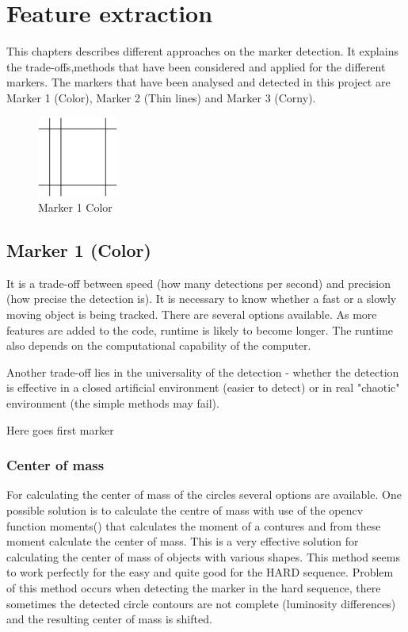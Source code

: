 \chapter{Feature extraction} %
\label{chap:feature_extraction}
This chapters describes different approaches on the marker detection. It explains the trade-offs,methods that have been considered and applied for the different markers. The markers that have been analysed and detected in this project are Marker 1 (Color), Marker 2 (Thin lines) and Marker 3 (Corny). 

\begin{figure}[ht!]
	\centering
	\includegraphics[width=100px]{figures/Marker2a}
	\caption{Marker 1 Color}
	\label{fig:markerColor}
\end{figure}


\section{Marker 1 (Color)} 
It is a trade-off between speed (how many detections per second) and precision (how precise the detection is). It is necessary to know whether a fast or a slowly moving object is being tracked. There are several options available. As more features are added to the code, runtime is likely to become longer. The runtime also depends on the computational capability of the computer.

Another trade-off lies in the universality of the detection - whether the detection is effective in a closed artificial environment (easier to detect) or in real "chaotic" environment (the simple methods may fail).

\newpage

Here goes first marker


\subsection{Center of mass}
For calculating the center of mass of the circles several options are available.
One possible solution is to calculate the centre of mass with use of the opencv function
moments() that calculates the moment of a contures and from these moment calculate the
center of mass. This is a very effective solution for calculating the center of mass of
objects with various shapes. This method seems to work perfectly for the easy and quite good
for the HARD sequence. Problem of this method occurs when detecting the marker in the hard sequence,
there sometimes the detected circle contours are not complete (luminosity differences) and the resulting
center of mass is shifted. 

